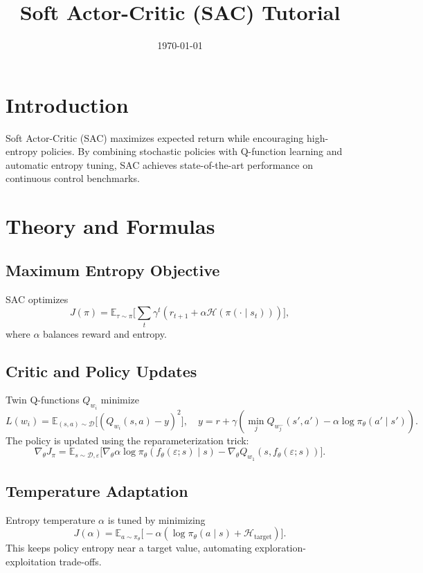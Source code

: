 ﻿\documentclass[12pt]{article}
\title{Soft Actor-Critic (SAC) Tutorial}
\author{}
\date{\today}
\begin{document}
\maketitle

\section{Introduction}
Soft Actor-Critic (SAC) maximizes expected return while encouraging high-entropy policies. By combining stochastic policies with Q-function learning and automatic entropy tuning, SAC achieves state-of-the-art performance on continuous control benchmarks.

\section{Theory and Formulas}
\subsection{Maximum Entropy Objective}
SAC optimizes
\begin{equation}
J(\pi) = \mathbb{E}_{\tau \sim \pi}\Big[ \sum_{t} \gamma^t ( r_{t+1} + \alpha \mathcal{H}(\pi(\cdot\mid s_t)) ) \Big],
\end{equation}
where \(\alpha\) balances reward and entropy.

\subsection{Critic and Policy Updates}
Twin Q-functions \(Q_{w_i}\) minimize
\begin{equation}
L(w_i) = \mathbb{E}_{(s,a) \sim \mathcal{D}}\Big[ (Q_{w_i}(s,a) - y)^2 \Big], \quad y = r + \gamma (\min_j Q_{w_j^-}(s', a') - \alpha \log \pi_\theta(a'\mid s')).
\end{equation}
The policy is updated using the reparameterization trick:
\begin{equation}
\nabla_\theta J_{\pi} = \mathbb{E}_{s \sim \mathcal{D}, \varepsilon}\big[ \nabla_\theta \alpha \log \pi_\theta(f_\theta(\varepsilon; s)\mid s) - \nabla_\theta Q_{w_1}(s, f_\theta(\varepsilon; s)) \big].
\end{equation}

\subsection{Temperature Adaptation}
Entropy temperature \(\alpha\) is tuned by minimizing
\begin{equation}
J(\alpha) = \mathbb{E}_{a \sim \pi_\theta}\big[ -\alpha (\log \pi_\theta(a\mid s) + \mathcal{H}_{\text{target}}) \big].
\end{equation}
This keeps policy entropy near a target value, automating exploration-exploitation trade-offs.
\end{document}
